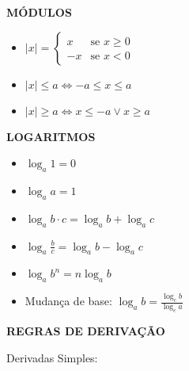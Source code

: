 \documentclass[twocolumn, 11pt]{article}
\newcommand{\twopartdef}[4]
{ \displaystyle
	\left\{
		\begin{array}{ll}
			#1 & \mbox{se } #2 \\
			#3 & \mbox{se } #4
		\end{array}
	\right.
}
\begin{document}
\MakeUppercase{\textbf{Módulos}}

\begin{itemize}
    \item $|x| = \twopartdef{x}{x \ge 0}{-x}{x < 0}$
    \item $|x| \le a \Leftrightarrow -a \le x \le a$
    \item $|x| \ge a \Leftrightarrow x \le -a \lor x \ge a$
\end{itemize}

\MakeUppercase{\textbf{Logaritmos}}

\begin{itemize}
    \item $\log_a 1 = 0$
    \item $\log_a a = 1$
    \item $\log_a b \cdot c = \log_a b + \log_a c$
    \item $\displaystyle \log_a \frac{b}{c} = \log_a b - \log_a c$
    \item $\log_a b^n = n \log_a b$
    \item Mudança de base: $\displaystyle \log_a b = \frac{\log_c b}{\log_c a}$
\end{itemize}

\vspace{4pt}
\MakeUppercase{\textbf{Regras de Derivação}}

Derivadas Simples:
\end{document}
